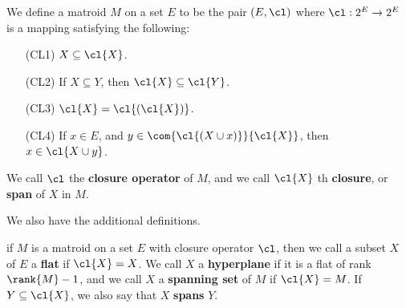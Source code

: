 \begin{definition}
    We define a matroid $M$ on a set  $E$ to be the pair  $(E,\cl)$ where
    $\cl:2^E \rightarrow 2^E$ is a mapping satisfying the following:
    \begin{enumerate}
        \item[(CL1)] $X \subseteq \cl{X}$.

        \item[(CL2)] If $X \subseteq Y$, then  $\cl{X} \subseteq \cl{Y}$.

        \item[(CL3)] $\cl{X}=\cl{(\cl{X})}$.

        \item[(CL4)] If $x \in E$, and  $y \in \com{\cl{(X \cup x)}}{\cl{X}}$,
            then $x \in \cl{X \cup y}$.
    \end{enumerate}
    We call $\cl$ the \textbf{closure operator} of  $M$, and we call  $\cl{X}$
    th \textbf{closure}, or \textbf{span} of $X$ in  $M$.
\end{definition}

We also have the additional definitions.

\begin{definition}
    if $M$ is a matroid on a set  $E$ with closure operator $\cl$, then we call
    a subset $X$ of  $E$ a  \textbf{flat} if $\cl{X}=X$. We call $X$ a
    \textbf{hyperplane} if it is a flat of rank $\rank{M}-1$, and we call $X$ a
     \textbf{spanning set} of $M$ if  $\cl{X}=M$. If $Y \subseteq \cl{X}$, we
     also say that $X$  \textbf{spans} $Y$.
\end{definition}

